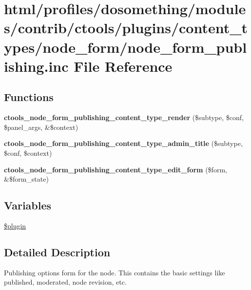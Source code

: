 \hypertarget{node__form__publishing_8inc}{
\section{html/profiles/dosomething/modules/contrib/ctools/plugins/content\_\-types/node\_\-form/node\_\-form\_\-publishing.inc File Reference}
\label{node__form__publishing_8inc}
}
\subsection*{Functions}
\begin{DoxyCompactItemize}
\item 
\hypertarget{node__form__publishing_8inc_ae85e06288f2b4a7d3c47cfca839b3277}{
{\bfseries ctools\_\-node\_\-form\_\-publishing\_\-content\_\-type\_\-render} (\$subtype, \$conf, \$panel\_\-args, \&\$context)}
\label{node__form__publishing_8inc_ae85e06288f2b4a7d3c47cfca839b3277}

\item 
\hypertarget{node__form__publishing_8inc_a141a523d55eb2b8f492225a3835454a0}{
{\bfseries ctools\_\-node\_\-form\_\-publishing\_\-content\_\-type\_\-admin\_\-title} (\$subtype, \$conf, \$context)}
\label{node__form__publishing_8inc_a141a523d55eb2b8f492225a3835454a0}

\item 
\hypertarget{node__form__publishing_8inc_af58b23aaa386ca3897b73ac9682d6f60}{
{\bfseries ctools\_\-node\_\-form\_\-publishing\_\-content\_\-type\_\-edit\_\-form} (\$form, \&\$form\_\-state)}
\label{node__form__publishing_8inc_af58b23aaa386ca3897b73ac9682d6f60}

\end{DoxyCompactItemize}
\subsection*{Variables}
\begin{DoxyCompactItemize}
\item 
\hyperlink{node__form__publishing_8inc_ada8a7130088351710bb02ed622d6bf65}{\$plugin}
\end{DoxyCompactItemize}


\subsection{Detailed Description}
Publishing options form for the node. This contains the basic settings like published, moderated, node revision, etc. 

